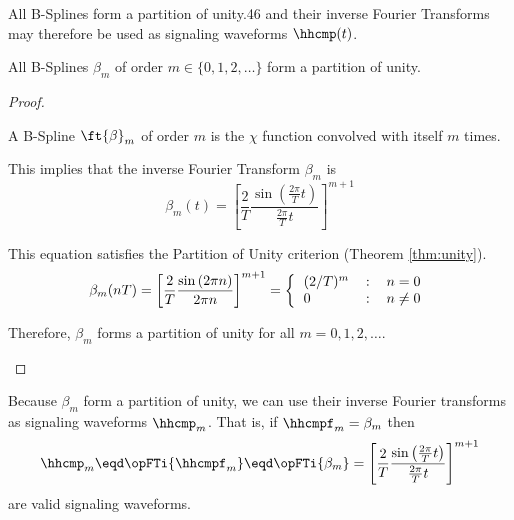 All B-Splines form a partition of unity.\citep{goswami}{46}
and their inverse Fourier Transforms may therefore be used
as signaling waveforms $\hhcmp(t)$.
\begin{theorem}
All B-Splines $\beta_m$ of order $m\in\{0,1,2,\ldots\}$
form a partition of unity.
\end{theorem}
\begin{proof}
\begin{enume}
   \item A B-Spline $\ft{\beta}_m$ of order $m$
         is the $\chi$ function convolved with itself $m$ times.
   \item This implies that the inverse Fourier Transform $\beta_m$ is
         \[ \beta_m(t) =
             \left[
             \frac{2}{T}
             \frac{\sin\left(\frac{2\pi}{T}t\right)}{\frac{2\pi}{T}t}
             \right]^{m+1}
         \]
   \item This equation satisfies the Partition of Unity criterion (Theorem \ref{thm:unity}).
         \[ \beta_m(nT) =
             \left[
             \frac{2}{T}
             \frac{\sin\left(2\pi n\right)}{2\pi n}
             \right]^{m+1}
             = \left\{
                  \begin{tabular}{lcl}
                     $(2/T)^m$ & : & $n=0$ \\
                     $0$       & : & $n\neq0$
                  \end{tabular}
               \right.
         \]
   \item Therefore, $\beta_m$ forms a partition of unity for all $m=0,1,2,\ldots$.
\end{enume}
\end{proof}

Because $\beta_m$ form a partition of unity,
we can use their inverse Fourier transforms as signaling waveforms $\hhcmp_m$.
That is, if $\hhcmpf_m=\beta_m$ then
\[ \hhcmp_m \eqd \opFTi{\hhcmpf_m} \eqd \opFTi{\beta_m} =
             \left[
             \frac{2}{T}
             \frac{\sin\left(\frac{2\pi}{T}t\right)}{\frac{2\pi}{T}t}
             \right]^{m+1}
\]
are valid signaling waveforms.


